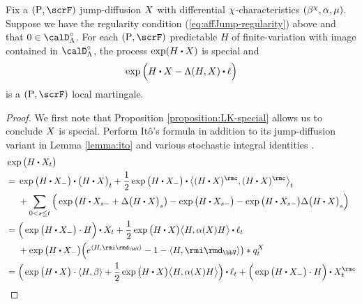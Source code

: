 \begin{theorem}
  \label{theorem:LK-exponential-martingale}
  Fix a $(\Prb, \scrF)$ jump-diffusion $X$ with differential $\chi$-characteristics $(\beta^\chi, \alpha, \mu)$.
  Suppose we have the regularity condition (\ref{eq:affJump-regularity}) above and that $0 \in \odeSpace^\circ$.
  For each $(\Prb, \scrF)$ predictable $H$ of finite-variation with image contained in $\odeSpace^\circ$, the process $\exp(H \shortInt \X)$ is special and 
  \[
    \exp\Big(H \shortInt \X - \ode(H, \X) \shortInt \leb\Big)
  \]
  is a $(\Prb, \scrF)$ local martingale.
\end{theorem}
\begin{proof}
  \label{proof:theorem:LK-exponential-martingale}
  We first note that Proposition \ref{proposition:LK-special} allows us to conclude $X$ is special.
  Perform It\^o's formula \cite[Theoerem I.4.57]{jacod2003} in addition to its jump-diffusion variant in Lemma \ref{lemma:ito} and various stochastic integral identities \cite[Remarks I.4.36, I.4.37, Theorem I.4.40(d), Proposition II.1.30(b)]{jacod2003}.
  \begin{align}
    \notag
    &\exp\big( H \shortInt \X_t \big) \\
    \notag
    &= \begin{aligned}[t]
      &\exp\big( H \shortInt \X_- \big) \shortInt \big( H \shortInt \X \big)_t + \frac12 \exp\big( H \shortInt \X_- \big) \shortInt \bprj{(H\shortInt \X)^\rmc}{(H\shortInt\X)^\rmc}_t \\
      &+ \sum_{0<s\leq t} \Big( \exp\big(H \shortInt \X_{s-} + \Delta\big(H \shortInt \X\big)_s \big) - \exp\big(H\shortInt \X_{s-}\big) - \exp\big(H \shortInt\X_{s-}\big) \Delta \big(H \shortInt \X\big)_s\Big)
    \end{aligned} \\
    \notag
    &= \begin{aligned}[t]
      &\Big(\exp\big( H \shortInt \X_- \big) \cdot H \Big) \shortInt \X_t + \frac12 \exp\big( H \shortInt \X \big) \bprj{H}{\affDiff(\X)H} \shortInt \leb_t \\
      &+ \exp\big(H\shortInt\X_-\big) \Big( e^{\prj{H}{\id_\vecSpace}} - 1 - \prj{H}{\id_\vecSpace} \big) \ast \jumpMeas^\X_t
    \end{aligned} \\
    \label{eq:LK-exp-ito-pause}
    &= \begin{aligned}[t]
      &\Big(\exp\big( H \shortInt \X \big) \cdot \prj{H}{\affDrift} + \frac12 \exp\big( H \shortInt \X \big) \bprj{H}{\affDiff(\X)H} \Big) \shortInt \leb_t + \Big( \exp\big( H \shortInt \X_- \big) \cdot H \Big) \shortInt \X^\rmc_t \\

\end{aligned}
\end{align}
\end{proof}
